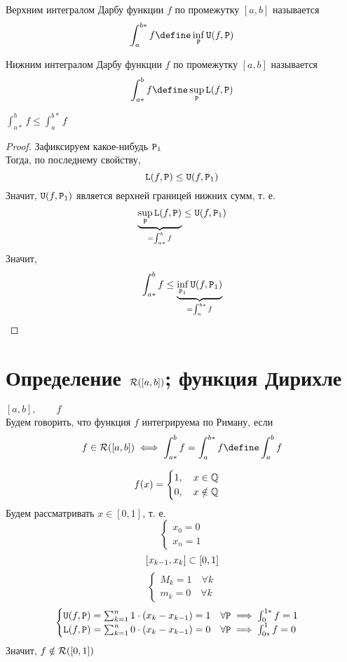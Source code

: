 \begin{definition}
	Верхним интегралом Дарбу функции $ f $ по промежутку $ [a, b] $ называется
    $$ \int_a^{b*} f \define \inf\limits_{\Par} \Ud(f, \Par) $$
\end{definition}

\begin{definition}
	Нижним интегралом Дарбу функции $ f $ по промежутку $ [a, b] $ называется
    $$ \int_{a*}^b f \define \sup\limits_{\Par} \Ld(f, \Par) $$
\end{definition}

\begin{statement}
    $ \int_{a*}^b f \le \int_a^{b*} f $
\end{statement}

\begin{proof}
	Зафиксируем какое-нибудь $ \mathtt{P}_1 $ \\
    Тогда, по последнему свойству,
    $$ \mathtt{L}(f, \mathtt{P}) \le \mathtt{U}(f, \mathtt{P}_1) $$
    Значит, $ \mathtt{U}(f, \mathtt{P}_1) $ является верхней границей нижних сумм, т. е.
    $$ \underbrace{\sup\limits_{\mathtt{P}} \mathtt{L}(f, \mathtt{P})}_{= \int_{a*}^b f} \le \mathtt{U}(f, \mathtt{P}_1) $$
    Значит,
    $$ \int_{a*}^b f \le \underbrace{\inf\limits_{\mathtt{P}_1} \mathtt{U}(f, \mathtt{P}_1)}_{ = \int_a^{b*} f} $$
\end{proof}

\section{Определение \texorpdfstring{$ \mathcal{R}([a, b]) $}{R([a, b])}; функция Дирихле}

\begin{definition}
	$ [a, b], \qquad f $ \\
    Будем говорить, что функция $ f $ интегрируема по Риману, если
    $$ f \in \Ri([a, b]) \iff \int_{a*}^b f = \int_a^{b*} f \define \int_a^b f $$
\end{definition}

\begin{eg}
	$$ f(x) =
    \begin{cases}
    	1, \quad x \in \mathbb{Q} \\
        0, \quad x \notin \mathbb{Q}
    \end{cases} $$
    Будем рассматривать $ x \in [0, 1] $, т. е.
    $$
    \begin{cases}
    	x_0 = 0 \\
        x_n = 1
    \end{cases} $$
    $$ [x_{k - 1}, x_k] \subset [0, 1] $$
    $$
    \begin{cases}
    	M_k = 1 \quad \forall k \\
        m_k = 0 \quad \forall k
    \end{cases} $$
    $$
    \begin{cases}
        \mathtt{U}(f, \mathtt{P}) = \sum_{k = 1}^n 1 \cdot (x_k - x_{k - 1}) = 1 \quad \forall \mathtt{P} \implies \int_0^{1*} f = 1 \\
        \mathtt{L}(f, \mathtt{P}) = \sum_{k = 1}^n 0 \cdot (x_k - x_{k - 1}) = 0 \quad \forall \mathtt{P} \implies \int_{0*}^1 f = 0
    \end{cases} $$
    Значит, $ f \notin \mathcal{R}([0, 1]) $
\end{eg}


